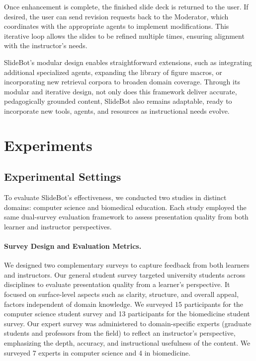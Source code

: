 \documentclass[letterpaper]{article} %
\begin{document}
Once enhancement is complete, the finished slide deck is returned to the user. If desired, the user can send revision requests back to the Moderator, which coordinates with the appropriate agents to implement modifications. This iterative loop allows the slides to be refined multiple times, ensuring alignment with the instructor’s needs. 

SlideBot's modular design enables straightforward extensions, such as integrating additional specialized agents, expanding the library of figure macros, or incorporating new retrieval corpora to broaden domain coverage. Through its modular and iterative design, not only does this framework deliver accurate, pedagogically grounded content, SlideBot also remains adaptable, ready to incorporate new tools, agents, and resources as instructional needs evolve. 



\section{Experiments}

\subsection{Experimental Settings}


To evaluate SlideBot's effectiveness, we conducted two studies in distinct domains: computer science and biomedical education. Each study employed the same dual-survey evaluation framework to assess presentation quality from both learner and instructor perspectives.


\paragraph{Survey Design and Evaluation Metrics.}
We designed two complementary surveys to capture feedback from both learners and instructors. Our general student survey targeted university students across disciplines to evaluate presentation quality from a learner’s perspective. It focused on surface-level aspects such as clarity, structure, and overall appeal, factors independent of domain knowledge. We surveyed 15 participants for the computer science student survey and 13 participants for the biomedicine student survey. Our expert survey was administered to domain-specific experts (graduate students and professors from the field) to reflect an instructor’s perspective, emphasizing the depth, accuracy, and instructional usefulness of the content. We surveyed 7 experts in computer science and 4 in biomedicine.
\end{document}
